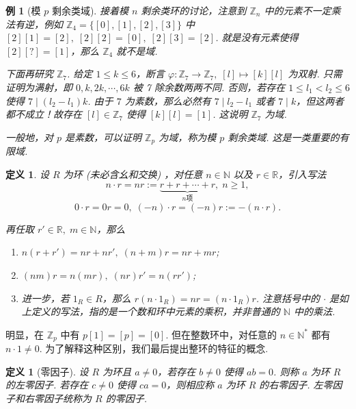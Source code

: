 \documentclass[10pt,openany]{article}
\theoremstyle{thmstyle} %
\theoremstyle{defstyle} %
\newtheorem{definition}[theorem]{定义}
\theoremstyle{prostyle} %
\theoremstyle{exastyle}
\newtheorem{example}[theorem]{例}
\theoremstyle{remstyle}
\begin{document}
\begin{example}[模 \( p \) 剩余类域]
	接着模 \( n \) 剩余类环的讨论，注意到 \( \mathbb{Z}_n \) 中的元素不一定乘法有逆，例如 \( \mathbb{Z}_4=\{[0],[1],[2],[3]\} \) 中 \( [2][1]=[2], \; [2][2]=[0], \; [2][3]=[2] \). 就是没有元素使得 \( [2][?]=[1] \)，那么 \( \mathbb{Z}_4 \) 就不是域.
	 
	\vspace{1ex}
	
	下面再研究 \( \mathbb{Z}_7 \). 给定 \( 1 \leq k \leq 6  \)，断言 \( \varphi: \mathbb{Z}_7 \to \mathbb{Z}_7, \; [l] \mapsto [k][l] \) 为双射. 只需证明为满射，即 \( 0,k,2k,\cdots,6k \) 被 7 除余数两两不同. 否则，若存在 \( 1 \leq l_1 < l_2 \leq 6 \) 使得 \( 7 \mid (l_2-l_1)k \). 由于 \( 7 \) 为素数，那么必然有 \( 7 \mid l_2-l_1 \) 或者 \( 7 \mid k \)，但这两者都不成立！故存在 \( [l] \in \mathbb{Z}_7 \) 使得 \( [k][l]=[1] \). 这说明 \( \mathbb{Z}_7 \) 为域.
	
	\vspace{1ex}
	
	一般地，对 \( p \) 是素数，可以证明 \( \mathbb{Z}_p \) 为域，称为模 \( p \) 剩余类域. 这是一类重要的有限域. 
\end{example}


\begin{definition}
	设 \( R \) 为环 (未必含幺和交换) ，对任意 \( n \in \mathbb{N} \) 以及 \( r \in \mathbb{R} \)，引入写法
	\[ n \cdot r=nr:=\underbrace{r+r+\cdots+r}_{n \text{项}}, \; n \geq 1, \]
	\[ 0 \cdot r =0r=0, \; (-n) \cdot r=(-n)r:=-(n \cdot r). \]
	
	再任取 \( r' \in \mathbb{R}, \; m \in \mathbb{N} \)，那么
	\begin{enumerate}[(1)]
		\item \( n(r+r')=nr+nr', \; (n+m)r=nr+mr \);
		\item \( (nm)r=n(mr), \; (nr)r'=n(rr') \);
		\item 进一步，若 \( 1_R \in R \)，那么 \( r(n \cdot 1_R)=nr=(n \cdot 1_R)r \). 注意括号中的 \( \cdot \) 是如上定义的写法，指的是一个数和环中元素的乘积，并非普通的 \( \mathbb{N} \) 中的乘法.
	\end{enumerate}
\end{definition}

明显，在 \( \mathbb{Z}_p\) 中有 \( p[1]=[p]=[0] \). 但在整数环中，对任意的 \( n \in \mathbb{N}^* \) 都有 \( n \cdot 1 \neq 0 \). 为了解释这种区别，我们最后提出整环的特征的概念.

\begin{definition}[零因子]
	设 \( R \) 为环且 \( a \neq 0 \)，若存在 \( b \neq 0 \) 使得 \( ab=0 \). 则称 \( a \) 为环 \( R \) 的左零因子. 若存在 \( c \neq 0 \) 使得 \( ca = 0 \)，则相应称 \( a \) 为环 \( R \) 的右零因子. 左零因子和右零因子统称为 \( R \) 的零因子.
\end{definition}
\end{document}

